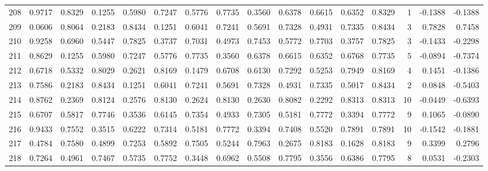 \begin{tabular}{lrrrrrrrrrrrrrrr}
208 &      0.9717 &  0.8329 &  0.1255 &  0.5980 &  0.7247 &  0.5776 &  0.7735 &  0.3560 &  0.6378 &  0.6615 &   0.6352 &     0.8329 &      1 &                   -0.1388 &                    -0.1388 \\
209 &      0.0606 &  0.8064 &  0.2183 &  0.8434 &  0.1251 &  0.6041 &  0.7241 &  0.5691 &  0.7328 &  0.4931 &   0.7335 &     0.8434 &      3 &                    0.7828 &                     0.7458 \\
210 &      0.9258 &  0.6960 &  0.5447 &  0.7825 &  0.3737 &  0.7031 &  0.4973 &  0.7453 &  0.5772 &  0.7703 &   0.3757 &     0.7825 &      3 &                   -0.1433 &                    -0.2298 \\
211 &      0.8629 &  0.1255 &  0.5980 &  0.7247 &  0.5776 &  0.7735 &  0.3560 &  0.6378 &  0.6615 &  0.6352 &   0.6768 &     0.7735 &      5 &                   -0.0894 &                    -0.7374 \\
212 &      0.6718 &  0.5332 &  0.8029 &  0.2621 &  0.8169 &  0.1479 &  0.6708 &  0.6130 &  0.7292 &  0.5253 &   0.7949 &     0.8169 &      4 &                    0.1451 &                    -0.1386 \\
213 &      0.7586 &  0.2183 &  0.8434 &  0.1251 &  0.6041 &  0.7241 &  0.5691 &  0.7328 &  0.4931 &  0.7335 &   0.5017 &     0.8434 &      2 &                    0.0848 &                    -0.5403 \\
214 &      0.8762 &  0.2369 &  0.8124 &  0.2576 &  0.8130 &  0.2624 &  0.8130 &  0.2630 &  0.8082 &  0.2292 &   0.8313 &     0.8313 &     10 &                   -0.0449 &                    -0.6393 \\
215 &      0.6707 &  0.5817 &  0.7746 &  0.3536 &  0.6145 &  0.7354 &  0.4933 &  0.7305 &  0.5181 &  0.7772 &   0.3394 &     0.7772 &      9 &                    0.1065 &                    -0.0890 \\
216 &      0.9433 &  0.7552 &  0.3515 &  0.6222 &  0.7314 &  0.5181 &  0.7772 &  0.3394 &  0.7408 &  0.5520 &   0.7891 &     0.7891 &     10 &                   -0.1542 &                    -0.1881 \\
217 &      0.4784 &  0.7580 &  0.4899 &  0.7253 &  0.5892 &  0.7505 &  0.5244 &  0.7963 &  0.2675 &  0.8183 &   0.1628 &     0.8183 &      9 &                    0.3399 &                     0.2796 \\
218 &      0.7264 &  0.4961 &  0.7467 &  0.5735 &  0.7752 &  0.3448 &  0.6962 &  0.5508 &  0.7795 &  0.3556 &   0.6386 &     0.7795 &      8 &                    0.0531 &                    -0.2303 \\

\end{tabular}
